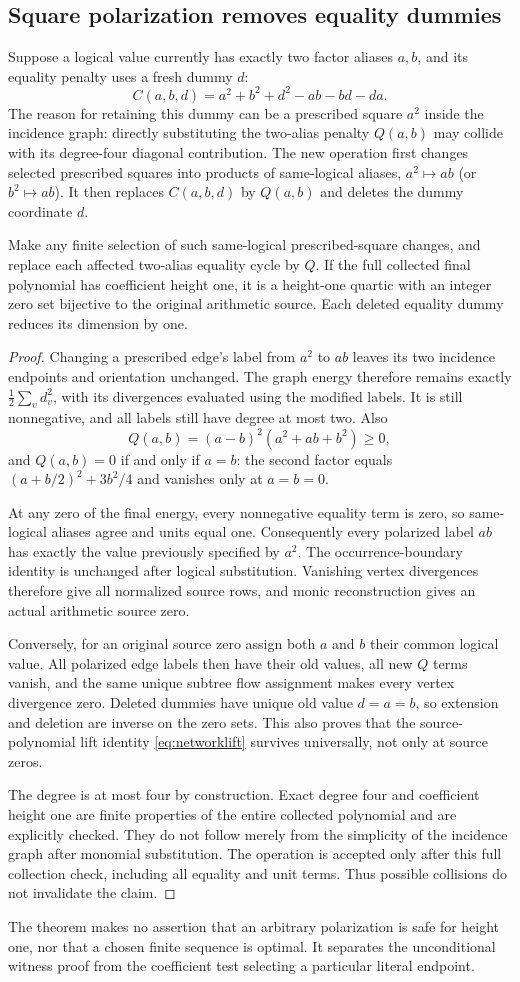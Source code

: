 \subsection{Square polarization removes equality dummies}
Suppose a logical value currently has exactly two factor aliases $a,b$,
and its equality penalty uses a fresh dummy $d$:
\[
 C(a,b,d)=a^2+b^2+d^2-ab-bd-da.
\]
The reason for retaining this dummy can be a prescribed square $a^2$
inside the incidence graph: directly substituting the two-alias penalty
$Q(a,b)$ may collide with its degree-four diagonal contribution. The new
operation first changes selected prescribed squares into products of
same-logical aliases, $a^2\mapsto ab$ (or $b^2\mapsto ab$). It then replaces
$C(a,b,d)$ by $Q(a,b)$ and deletes the dummy coordinate $d$.

\begin{theorem}\label{thm:polarization}
Make any finite selection of such same-logical prescribed-square changes,
and replace each affected two-alias equality cycle by $Q$. If the full
collected final polynomial has coefficient height one, it is a height-one
quartic with an integer zero set bijective to the original arithmetic
source. Each deleted equality dummy reduces its dimension by one.
\end{theorem}
\begin{proof}
Changing a prescribed edge's label from $a^2$ to $ab$ leaves its two
incidence endpoints and orientation unchanged. The graph energy therefore
remains exactly $\frac12\sum_v d_v^2$, with its divergences evaluated using
the modified labels. It is still nonnegative, and all labels still have
degree at most two. Also
\[
 Q(a,b)=(a-b)^2(a^2+ab+b^2)\ge0,
\]
and $Q(a,b)=0$ if and only if $a=b$: the second factor equals
$(a+b/2)^2+3b^2/4$ and vanishes only at $a=b=0$.

At any zero of the final energy, every nonnegative equality term is zero,
so same-logical aliases agree and units equal one. Consequently every
polarized label $ab$ has exactly the value previously specified by $a^2$.
The occurrence-boundary identity is unchanged after logical substitution.
Vanishing vertex divergences therefore give all normalized source rows,
and monic reconstruction gives an actual arithmetic source zero.

Conversely, for an original source zero assign both $a$ and $b$ their
common logical value. All polarized edge labels then have their old values,
all new $Q$ terms vanish, and the same unique subtree flow assignment makes
every vertex divergence zero. Deleted dummies have unique old value $d=a=b$,
so extension and deletion are inverse on the zero sets. This also proves
that the source-polynomial lift identity \eqref{eq:networklift} survives
universally, not only at source zeros.

The degree is at most four by construction. Exact degree four and
coefficient height one are finite properties of the entire collected
polynomial and are explicitly checked. They do not follow merely from the
simplicity of the incidence graph after monomial substitution. The operation
is accepted only after this full collection check, including all equality
and unit terms. Thus possible collisions do not invalidate the claim.
\end{proof}
The theorem makes no assertion that an arbitrary polarization is safe for
height one, nor that a chosen finite sequence is optimal. It separates the
unconditional witness proof from the coefficient test selecting a particular
literal endpoint.



